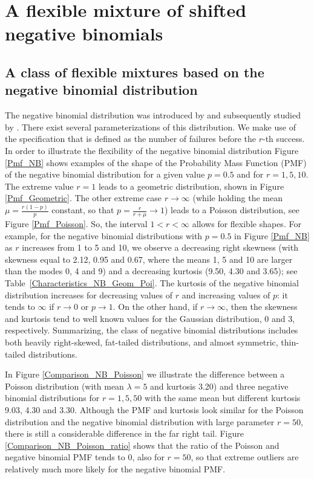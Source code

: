\documentclass[11pt]{article}
\begin{document}
\section{A flexible mixture of shifted negative binomials  \label{sec:mixturemodels} }



\subsection{A class of flexible mixtures based on the negative binomial distribution \label{subsection_mixture_shifted_NB} } 

The negative binomial distribution was introduced by \cite{Pascal:1679} and subsequently studied by \cite{Montmort:1713}.
There exist several parameterizations of this distribution.
We make use of the specification that is defined as the number of failures
before the $r$-th success. %
In order to illustrate the flexibility of the negative binomial distribution
Figure \ref{Pmf_NB} shows examples of the shape of the Probability Mass Function (PMF) of the negative binomial distribution
for a given value $p = 0.5$ and for $r=1,5,10$. The extreme value $r = 1$ leads to a geometric distribution, shown in Figure \ref{Pmf_Geometric}.
The other extreme case $r \rightarrow \infty$ (while holding the mean $\mu = \frac{r(1-p)}{p}$ constant, so that $p= \frac{r}{r+\mu} \rightarrow 1$) leads to a Poisson distribution, see  Figure \ref{Pmf_Poisson}.
So, the interval $1 < r < \infty$ allows for flexible shapes. 
For example, for the negative binomial distributions with $p = 0.5$ in Figure \ref{Pmf_NB}
as $r$ increases from 1 to 5 and 10,
we observe a decreasing right skewness (with skewness equal to 2.12, 0.95 and 0.67, where the means 1, 5 and 10 are larger than the modes 0, 4 and 9) and a decreasing kurtosis (9.50, 4.30 and 3.65);
see Table~\ref{Characteristics_NB_Geom_Poi}.
The kurtosis of the negative binomial distribution increases for decreasing values of $r$
and increasing values of $p$: it tends to $\infty$ if $r \rightarrow 0$ or $p \rightarrow 1$.
On the other hand, if $r \rightarrow \infty$, then the skewness and kurtosis tend to well known values for the Gaussian distribution, 0 and 3, respectively. 
Summarizing, the class of negative binomial distributions includes
both heavily right-skewed, fat-tailed distributions, and 
almost symmetric, thin-tailed distributions.

In Figure \ref{Comparison_NB_Poisson} we illustrate the difference between a Poisson distribution
(with mean $\lambda=5$ and kurtosis 3.20) and three negative binomial distributions for $r=1,5,50$ with the same mean but different kurtosis 9.03, 4.30 and 3.30.
Although the PMF and kurtosis look similar for the Poisson distribution and the negative
binomial distribution with large parameter $r=50$,
there is still a considerable difference in the far right tail.
Figure \ref{Comparison_NB_Poisson_ratio} shows that the ratio of the Poisson and negative binomial PMF
tends to 0, also for $r=50$,
so that extreme outliers are relatively much more likely for the negative binomial PMF. 
\end{document}
